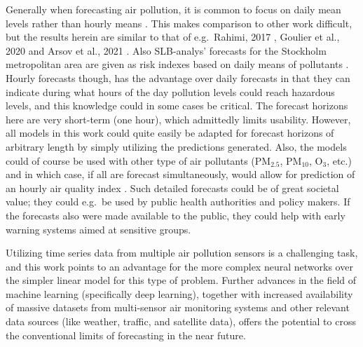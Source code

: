 Generally when forecasting air pollution, it is common to focus on daily mean levels rather than hourly means \cite{atmos7020015, Shams2021}. This makes comparison to other work difficult, but the results herein are similar to that of e.g.\ Rahimi, 2017 \cite{Rahimi2017}, Goulier et al., 2020\cite{Goulier2020} and Arsov et al., 2021 \cite{Arsov2021}. Also SLB-analys' forecasts for the Stockholm metropolitan area are given as risk indexes based on daily means of pollutants \cite{slbanalys}. Hourly forecasts though, has the advantage over daily forecasts in that they can indicate during what hours of the day pollution levels could reach hazardous levels, and this knowledge could in some cases be critical. The forecast horizons here are very short-term (one hour), which admittedly limits usability. However, all models in this work could quite easily be adapted for forecast horizons of arbitrary length by simply utilizing the predictions generated. Also, the models could of course be used with other type of air pollutants (PM$_{2.5}$, PM$_{10}$, O$_3$, etc.) and in which case, if all are forecast simultaneously, would allow for prediction of an hourly air quality index \cite{VanLoon2010}. Such detailed forecasts could be of great societal value; they could e.g.\ be used by public health authorities and policy makers. If the forecasts also were made available to the public, they could help with early warning systems aimed at sensitive groups.

Utilizing time series data from multiple air pollution sensors is a challenging task, and this work points to an advantage for the more complex neural networks over the simpler linear model for this type of problem. 
%
Further advances in the field of machine learning (specifically deep learning), together with increased availability of massive datasets from multi-sensor air monitoring systems and other relevant data sources (like weather, traffic, and satellite data), offers the potential to cross the conventional limits of forecasting in the near future. 


